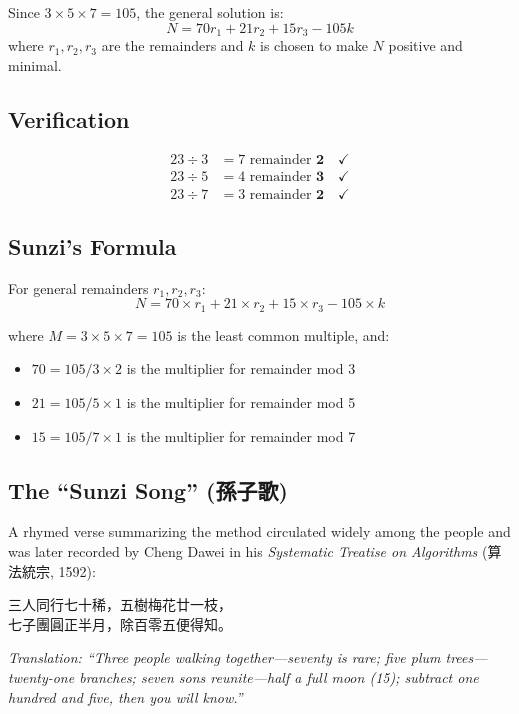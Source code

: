 \documentclass[11pt,a4paper]{article}
\newcommand{\zh}[1]{{\CJKfamily{}#1}}
\begin{document}
Since $3 \times 5 \times 7 = 105$, the general solution is:
\[N = 70r_1 + 21r_2 + 15r_3 - 105k\]
where $r_1, r_2, r_3$ are the remainders and $k$ is chosen to make $N$ positive and minimal.

\subsection*{Verification}

\begin{align*}
23 \div 3 &= 7 \text{ remainder } \mathbf{2} \quad \checkmark \\
23 \div 5 &= 4 \text{ remainder } \mathbf{3} \quad \checkmark \\
23 \div 7 &= 3 \text{ remainder } \mathbf{2} \quad \checkmark
\end{align*}

\subsection*{Sunzi's Formula}

For general remainders $r_1, r_2, r_3$:
\[
\boxed{N = 70 \times r_1 + 21 \times r_2 + 15 \times r_3 - 105 \times k}
\]

where $M = 3 \times 5 \times 7 = 105$ is the least common multiple, and:
\begin{itemize}
  \item $70 = 105/3 \times 2$ is the multiplier for remainder mod 3
  \item $21 = 105/5 \times 1$ is the multiplier for remainder mod 5
  \item $15 = 105/7 \times 1$ is the multiplier for remainder mod 7
\end{itemize}

\subsection*{The ``Sunzi Song'' (\zh{孫子歌})}

A rhymed verse summarizing the method circulated widely among the people and was later recorded by Cheng Dawei in his \textit{Systematic Treatise on Algorithms} (\zh{算法統宗}, 1592):

\begin{prefacebox}
\centering\large
\zh{三人同行七十稀，五樹梅花廿一枝，}\\[2pt]
\zh{七子團圓正半月，除百零五便得知。}
\end{prefacebox}

\textit{Translation: ``Three people walking together---seventy is rare; five plum trees---twenty-one branches; seven sons reunite---half a full moon (15); subtract one hundred and five, then you will know.''}
\end{document}
